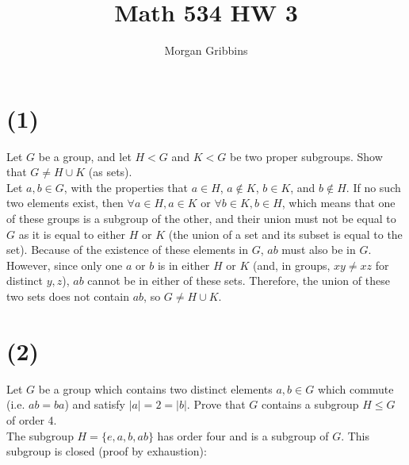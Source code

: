 \documentclass[12pt,letterpaper]{article}
\title{Math 534 HW 3}
\author{Morgan Gribbins}
\date{}
\begin{document}
	
\maketitle

\section*{(1)}
Let \(G\) be a group, and let \(H < G\) and \(K < G\) be two proper subgroups. Show that \(G \neq H \cup K\) (as sets). \\

Let \(a,b \in G\), with the properties that \(a \in H\), \(a \notin K\), \(b \in K\), and \(b \notin H\). If no such two elements exist, then \(\forall a \in H, a \in K \) or \(\forall b \in K, b \in H\), which means that one of these groups is a subgroup of the other, and their union must not be equal to \(G\) as it is equal to either \(H\) or \(K\) (the union of a set and its subset is equal to the set). Because of the existence of these elements in \(G\), \(ab\) must also be in \(G\). However, since only one \(a\) or \(b\) is in either \(H\) or \(K\) (and, in groups, \(xy \neq xz\) for distinct \(y,z\)), \(ab\) cannot be in either of these sets. Therefore, the union of these two sets does not contain \(ab\), so \(G \neq H \cup K\).

\section*{(2)}
Let \(G\) be a group which contains two distinct elements \(a,b \in G\) which commute (i.e. \(ab = ba\)) and satisfy \(|a| = 2 = |b|\). Prove that \(G\) contains a subgroup \(H \leq G\) of order 4. \\

The subgroup \(H = \{e, a, b, ab\}\) has order four and is a subgroup of \(G\). This subgroup is closed (proof by exhaustion):
\end{document}
